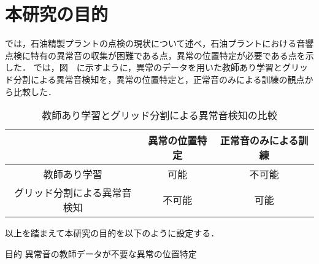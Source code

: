 \documentclass[../main]{subfiles}
\begin{document}
\section{本研究の目的}
\label{sec:intro_my_purpose}

では，石油精製プラントの点検の現状について述べ，石油プラントにおける音響点検に特有の異常音の収集が困難である点，異常の位置特定が必要である点を示した．
では，図　に示すように，異常のデータを用いた教師あり学習とグリッド分割による異常音検知を，異常の位置特定と，正常音のみによる訓練の観点から比較した．

\begin{table}[htbp]
  \centering
  \caption{教師あり学習とグリッド分割による異常音検知の比較}
  \label{tab:comparison}
  \begin{tabular}{|c|c|c|}
  \hline
   & 異常の位置特定 & 正常音のみによる訓練 \\ \hline
  教師あり学習 & 可能 & 不可能 \\ \hline
  グリッド分割による異常音検知 & 不可能 & 可能 \\ \hline
  \end{tabular}
\end{table}


以上を踏まえて本研究の目的を以下のように設定する．
\bigskip
\begin{itembox}[c]{目的}
  \centering
  異常音の教師データが不要な異常の位置特定
\end{itembox}
\end{document}
